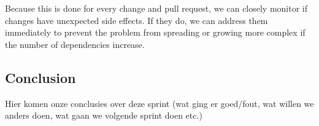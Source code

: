 		Because this is done for every change and pull request, we can closely monitor if changes have unexpected side effects. If they do, we can address them immediately to prevent the problem from spreading or growing more complex if the number of dependencies increase.
		
		
	
	\subsection{Conclusion}
		Hier komen onze conclusies over deze sprint (wat ging er goed/fout, wat willen we anders doen, wat gaan we volgende sprint doen etc.)
